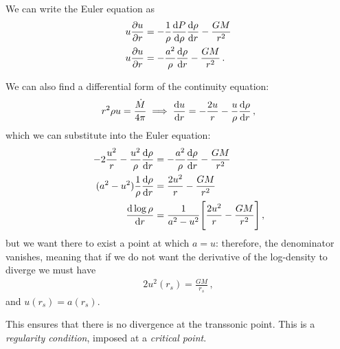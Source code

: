 \documentclass[main.tex]{subfiles}
\begin{document}
We can write the Euler equation as 
%
\begin{align}
u \pdv{u}{r} &= - \frac{1}{\rho } \dv{P}{\rho } \dv{\rho }{r} - \frac{GM}{r^2}   \\
u \pdv{u}{r} &= - \frac{a^2}{\rho } \dv{\rho }{r } - \frac{GM}{r^2}
\,.
\end{align}

We can also find a differential form of the continuity equation: 
%
\begin{align}
r^2 \rho u = \frac{\dot{M}}{4 \pi  } \implies
\dv{u}{r} = - \frac{2u}{r} - \frac{u}{\rho } \dv{\rho }{r}
\,,
\end{align}
%
which we can substitute into the Euler equation: 
%
\begin{align}
-2 \frac{u^2}{r} - \frac{u^2}{\rho } \dv{\rho }{r}
&= - \frac{a^2}{\rho } \dv{\rho }{r} - \frac{GM}{r^2}  \\
(a^2 - u^2) \frac{1}{\rho } \dv{\rho }{r} &= \frac{2u^2}{r} - \frac{GM}{r^2}  \\
\dv{\log \rho }{r} &= \frac{1}{a^2 - u^2} \qty[\frac{2u^2}{r} - \frac{GM}{r^2}]
\,,
\end{align}
%
but we want there to exist a point at which \(a = u\): therefore, the denominator vanishes, meaning that if we do not want the derivative of the log-density to diverge we must have 
%
\begin{align}
2 u^2 (r_s) = \frac{GM}{r_s}
\,,
\end{align}
%
and \(u (r_s) = a( r_s)\). 

This ensures that there is no divergence at the transsonic point. 
This is a \emph{regularity condition}, imposed at a \emph{critical point}.
\end{document}
